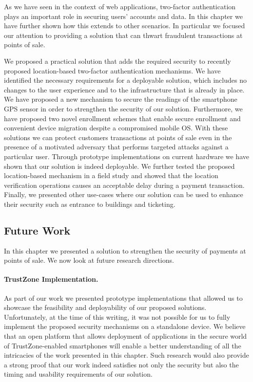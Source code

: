As we have seen in the context of web applications, two-factor authentication plays an important role in securing users' accounts and data. In this chapter we have further shown how this extends to other scenarios. In particular we focused our attention to providing a solution that can thwart fraudulent transactions at points of sale.

We proposed a practical solution that adds the required security to recently proposed location-based two-factor authentication mechanisms. We have identified the necessary requirements for a deployable solution, which includes no changes to the user experience and to the infrastructure that is already in place. We have proposed a new mechanism to secure the readings of the smartphone GPS sensor in order to strengthen the security of our solution. Furthermore, we have proposed two novel enrollment schemes that enable secure enrollment and convenient device migration despite a compromised mobile OS. With these solutions we can protect customers transactions at points of sale even in the presence of a motivated adversary that performs targeted attacks against a particular user. Through prototype implementations on current hardware we have shown that our solution is indeed deployable. We further tested the proposed location-based mechanism in a field study and showed that the location verification operations causes an acceptable delay during a payment transaction. Finally, we presented other use-cases where our solution can be used to enhance their security such as entrance to buildings and ticketing.

\subsection{Future Work}

In this chapter we presented a solution to strengthen the security of payments at points of sale. We now look at future research directions.

\paragraph{TrustZone Implementation.} As part of our work we presented prototype implementations that allowed us to showcase the feasibility and deployability of our proposed solutions. Unfortunately, at the time of this writing, it was not possible for us to fully implement the proposed security mechanisms on a standalone device. We believe that an open platform that allows deployment of applications in the secure world of TrustZone-enabled smartphones will enable a better understanding of all the intricacies of the work presented in this chapter. Such research would also provide a strong proof that our work indeed satisfies not only the security but also the timing and usability requirements of our solution.

